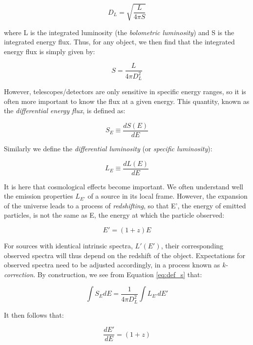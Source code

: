 \begin{equation}
D_{L} = \sqrt{\frac{L}{4 \pi S}}
\end{equation}

where L is the integrated luminosity (the \emph{bolometric luminosity}) and S is the integrated energy flux. Thus, for any object, we then find that the integrated energy flux is simply given by:

\begin{equation}
S = \frac{L}{4 \pi D_{L}^{2}}
\label{eq:def_s}
\end{equation}

However, telescopes/detectors are only sensitive in specific energy ranges, so it is often more important to know the flux at a given energy. This quantity, known as the \emph{differential energy flux}, is defined as:

\begin{equation}
S_{E} \equiv \frac{dS(E)}{dE}
\end{equation}

Similarly we define the \emph{differential luminosity} (or \emph{specific luminosity}):

\begin{equation}
L_{E} \equiv \frac{dL(E)}{dE}
\end{equation}

It is here that cosmological effects become important. We often understand well the emission properties $ L_{E'}$ of a source in its local frame. However, the expansion of the universe leads to a process of \emph{redshifting}, so that E', the energy of emitted particles, is not the same as E, the energy at which the particle observed:

\begin{equation}
E' = (1+z) E
\label{eq:redshift}
\end{equation}

For sources with identical intrinsic spectra, $L'(E')$, their corresponding observed spectra will thus depend on the redshift of the object. Expectations for observed spectra need to be adjusted accordingly, in a process known as \emph{k-correction}. By construction, we see from Equation \ref{eq:def_s} that:

\begin{equation}
\int S_{E} dE = \frac{1}{4 \pi D_{L}^{2}} \int L_{E'} dE'
\end{equation}

It then follows that:

\begin{equation}
\frac{dE'}{dE} = (1+z)
\end{equation}


